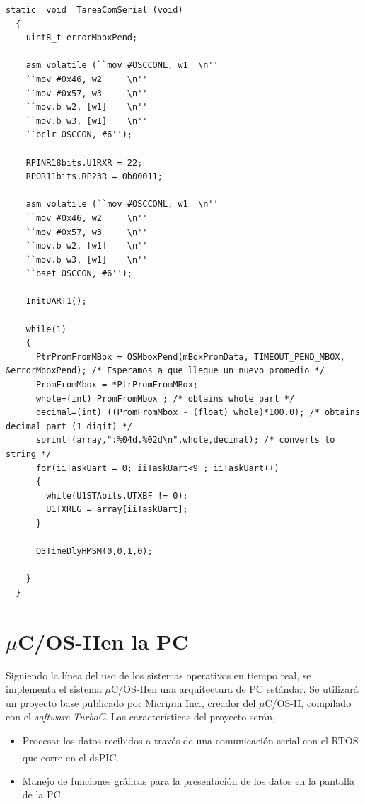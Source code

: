 \documentclass[11pt,a4paper,oneside]{article}
\def\uCOS{$\mu$C/OS-II\texttrademark}
\begin{document}
\begin{lstlisting}[caption={Función de la tarea \emph{TareaComSerial()}},label=code:func-tareacom]
  static  void  TareaComSerial (void)
  {
    uint8_t errorMboxPend;
    
    asm volatile (``mov #OSCCONL, w1  \n''
    ``mov #0x46, w2     \n''
    ``mov #0x57, w3     \n''
    ``mov.b w2, [w1]    \n''
    ``mov.b w3, [w1]    \n''
    ``bclr OSCCON, #6'');
    
    RPINR18bits.U1RXR = 22;
    RPOR11bits.RP23R = 0b00011;
    
    asm volatile (``mov #OSCCONL, w1  \n''
    ``mov #0x46, w2     \n''
    ``mov #0x57, w3     \n''
    ``mov.b w2, [w1]    \n''
    ``mov.b w3, [w1]    \n''
    ``bset OSCCON, #6'');
    
    InitUART1();
    
    while(1)
    {
      PtrPromFromMBox = OSMboxPend(mBoxPromData, TIMEOUT_PEND_MBOX, &errorMboxPend); /* Esperamos a que llegue un nuevo promedio */
      PromFromMbox = *PtrPromFromMBox;
      whole=(int) PromFromMbox ; /* obtains whole part */
      decimal=(int) ((PromFromMbox - (float) whole)*100.0); /* obtains decimal part (1 digit) */
      sprintf(array,":%04d.%02d\n",whole,decimal); /* converts to string */
      for(iiTaskUart = 0; iiTaskUart<9 ; iiTaskUart++)
      {
        while(U1STAbits.UTXBF != 0);
        U1TXREG = array[iiTaskUart];
      }
      
      OSTimeDlyHMSM(0,0,1,0);
      
    }
  }
\end{lstlisting}

\section{\uCOS en la PC}
\label{sec:ucos-pc}

Siguiendo la línea del uso de los sistemas operativos en tiempo real, se implementa el sistema \uCOS en una arquitectura de PC estándar. Se utilizará un proyecto base publicado por Micri$\mu$m Inc., creador del \uCOS, compilado con el \textsl{software} \emph{TurboC}. Las características del proyecto serán,

\begin{itemize}
\item Procesar los datos recibidos a través de una comunicación serial con el RTOS que corre en el dsPIC\textsuperscript{\textregistered}. 
\item Manejo de funciones gráficas para la presentación de los datos en la pantalla de la PC.
\end{itemize}
\end{document}
